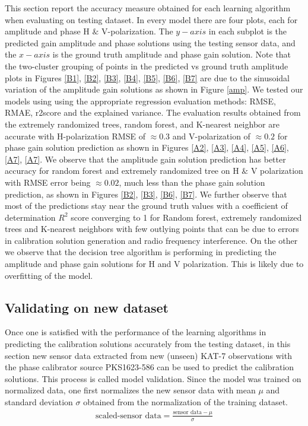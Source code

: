 This section report the accuracy measure obtained for each learning algorithm when evaluating on testing dataset. In every model there are four plots, each for amplitude and phase H $\&$ V-polarization. The $y-axis$ in each subplot is the predicted gain amplitude and phase solutions using the testing sensor data, and the $x-axis$ is the ground truth amplitude and phase gain solution. Note that the two-cluster grouping of points in the predicted vs ground truth amplitude plots in Figures \ref{B1}, \ref{B2}, \ref{B3}, \ref{B4}, \ref{B5}, \ref{B6}, \ref{B7} are due to the sinusoidal variation of the amplitude gain solutions as shown in Figure \ref{amp}. We tested our models using using the appropriate regression evaluation methods: RMSE, RMAE, r2score and the explained variance. The evaluation results obtained from the extremely randomized trees, random forest, and K-nearest neighbor are accurate with H-polarization RMSE of $\approx 0.3$  and V-polarization of $\approx 0.2$ for phase gain solution prediction as shown in Figures \ref{A2}, \ref{A3}, \ref{A4}, \ref{A5}, \ref{A6}, \ref{A7}, \ref{A7}. We observe that the amplitude gain solution prediction has better accuracy for random forest and extremely randomized tree on H $\&$ V polarization with RMSE error being $\approx 0.02$, much less than the phase gain solution prediction, as shown in Figures \ref{B2}, \ref{B3}, \ref{B6}, \ref{B7}. We further observe that most of the predictions stay near the ground truth values with a coefficient of determination $R^2$ score converging to 1 for Random forest, extremely randomized trees and K-nearest neighbors with few outlying points that can be due to errors in calibration solution generation and radio frequency interference. On the other we observe that the decision tree algorithm is performing in predicting the amplitude and phase gain solutions for H and V polarization. This is likely due to overfitting of the model. 


\subsection{Validating on new dataset}

Once one is satisfied with the performance of the learning algorithms in predicting the calibration solutions accurately from the testing dataset, in this section new sensor data extracted from new (unseen) KAT-7 observations with the phase calibrator source PKS1623-586 can be used to predict the calibration solutions. This process is called model validation. Since the model was trained on normalized data, one first normalizes the new sensor data with mean $\mu$ and standard deviation $\sigma$ obtained from the normalization of the training dataset.
\begin{align}
\text{scaled-sensor data}= \frac{\text{sensor data}- \mu}{\sigma}
\end{align}

